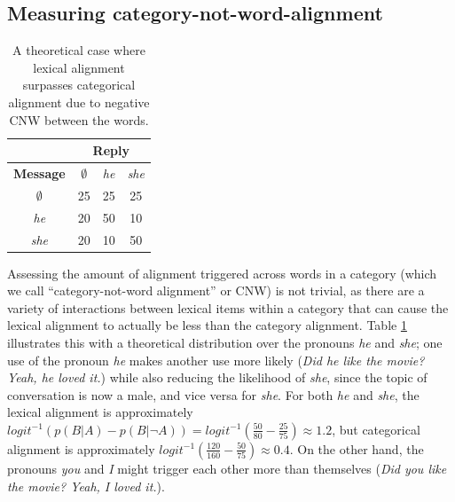 \documentclass[11pt]{article}
\begin{document}

\subsection{Measuring category-not-word-alignment}

\begin{table}[t]
\begin{center}
\begin{tabular}{|c||c|c|c|}
\hline
& \multicolumn{3}{|c|}{\bf Reply} \\
\hline
\bf Message & $\emptyset$ & \textit{he} & \textit{she} \\ \hline
$\emptyset$ & 25 & 25 & 25\\
\textit{he} & 20 & 50 & 10 \\
\textit{she} & 20 & 10 & 50 \\
\hline
\end{tabular}
\end{center}
\caption{\label{table:cnw-example1} A theoretical case where lexical alignment surpasses categorical alignment due to negative CNW between the words.}
\end{table}

Assessing the amount of alignment triggered across words in a category (which we call ``category-not-word alignment'' or CNW) is not trivial, as there are a variety of interactions between lexical items within a category that can cause the lexical alignment to actually be less than the category alignment. Table \ref{table:cnw-example1} illustrates this with a theoretical distribution over the pronouns \textit{he} and \textit{she}; one use of the pronoun \textit{he} makes another use more likely (\textit{Did he like the movie? Yeah, he loved it.}) while also reducing the likelihood of \textit{she}, since the topic of conversation is now a male, and vice versa for \textit{she}. For both \textit{he} and \textit{she}, the lexical alignment is approximately $logit^{-1}(p(B|A)-p(B|\neg A)) = logit^{-1}(\frac{50}{80}-\frac{25}{75}) \approx 1.2$,
but categorical alignment is approximately $logit^{-1}(\frac{120}{160}-\frac{50}{75}) \approx 0.4$. On the other hand, the pronouns \textit{you} and \textit{I} might trigger each other more than themselves (\textit{Did you like the movie? Yeah, I loved it.}). 
\end{document}
